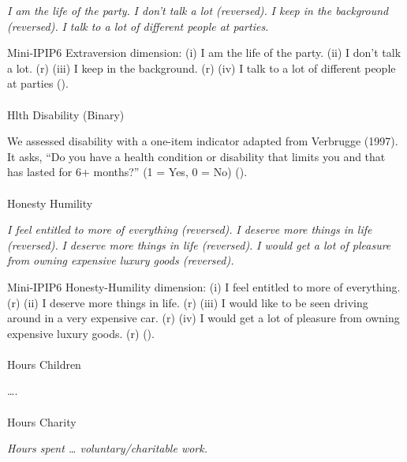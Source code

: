 \documentclass[
  single column]{article}
\makeatletter
\let\oldparagraph\paragraph
\renewcommand{\paragraph}{
    \@ifstar
      \xxxParagraphStar
      \xxxParagraphNoStar
  }
\newcommand{\xxxParagraphStar}[1]{\oldparagraph*{#1}\mbox{}}
\newcommand{\xxxParagraphNoStar}[1]{\oldparagraph{#1}\mbox{}}
\makeatother
\begin{document}
\emph{I am the life of the party.} \emph{I don't talk a lot (reversed).}
\emph{I keep in the background (reversed).} \emph{I talk to a lot of
different people at parties.}

Mini-IPIP6 Extraversion dimension: (i) I am the life of the party. (ii)
I don't talk a lot. (r) (iii) I keep in the background. (r) (iv) I talk
to a lot of different people at parties
().

\paragraph{Hlth Disability (Binary)}\label{hlth-disability-binary}

We assessed disability with a one-item indicator adapted from Verbrugge
(1997). It asks, ``Do you have a health condition or disability that
limits you and that has lasted for 6+ months?'' (1 = Yes, 0 = No)
().

\paragraph{Honesty Humility}\label{honesty-humility}

\emph{I feel entitled to more of everything (reversed).} \emph{I deserve
more things in life (reversed).} \emph{I deserve more things in life
(reversed).} \emph{I would get a lot of pleasure from owning expensive
luxury goods (reversed).}

Mini-IPIP6 Honesty-Humility dimension: (i) I feel entitled to more of
everything. (r) (ii) I deserve more things in life. (r) (iii) I would
like to be seen driving around in a very expensive car. (r) (iv) I would
get a lot of pleasure from owning expensive luxury goods. (r)
().

\paragraph{Hours Children}\label{hours-children}

\ldots.

\paragraph{Hours Charity}\label{hours-charity}

\emph{Hours spent \ldots{} voluntary/charitable work.}
\end{document}
